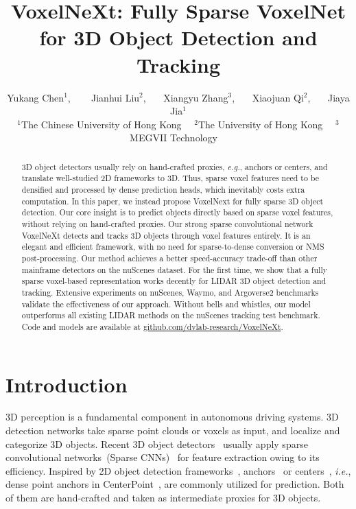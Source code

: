 \documentclass[10pt,twocolumn,letterpaper]{article}
\begin{document}
\title{VoxelNeXt: Fully Sparse VoxelNet for 3D Object Detection and Tracking}

\author{Yukang Chen$^{1}$,
~~~
Jianhui Liu$^{2}$,~~~
Xiangyu Zhang$^{3}$,~~~
Xiaojuan Qi$^{2}$,~~~
Jiaya Jia$^{1}$
\\[0.2cm]
$^1$The Chinese University of Hong Kong~~
$^2$The University of Hong Kong~~
$^3$MEGVII Technology~~
}
\maketitle

\begin{abstract}
   3D object detectors usually rely on hand-crafted proxies, {\em e.g.}, anchors or centers, and translate well-studied 2D frameworks to 3D. Thus, sparse voxel features need to be densified and processed by dense prediction heads, which inevitably costs extra computation.
   In this paper, we instead propose VoxelNext for fully sparse 3D object detection. Our core insight is to predict objects directly based on sparse voxel features, without relying on hand-crafted proxies.
   Our strong sparse convolutional network VoxelNeXt detects and tracks 3D objects through voxel features entirely. It is an elegant and efficient framework, with no need for sparse-to-dense conversion or NMS post-processing. Our method achieves a better speed-accuracy trade-off than other mainframe detectors on the nuScenes dataset.
   For the first time, we show that a fully sparse voxel-based representation works decently for LIDAR 3D object detection and tracking. Extensive experiments on nuScenes, Waymo, and Argoverse2 benchmarks validate the effectiveness of our approach. Without bells and whistles, our model outperforms all existing LIDAR methods on the nuScenes tracking test benchmark. Code and models are available at \href{https://github.com/dvlab-research/VoxelNeXt}{github.com/dvlab-research/VoxelNeXt}.
   
\end{abstract}

\section{Introduction}
\label{sec:intro}
3D perception is a fundamental component in autonomous driving systems. 3D detection networks take sparse point clouds or voxels as input, and localize and categorize 3D objects. Recent 3D object detectors~\cite{pvrcnn,centerpoint,voxel-rcnn} usually apply sparse convolutional networks~(Sparse CNNs)~\cite{second} for feature extraction owing to its efficiency. Inspired by 2D object detection frameworks~\cite{fasterrcnn,centernet}, anchors~\cite{second, voxel-rcnn} or centers~\cite{centerpoint}, {\em i.e.}, dense point anchors in CenterPoint~\cite{centerpoint}, are commonly utilized for prediction. 
Both of them are hand-crafted and taken as intermediate proxies for 3D objects. 
\end{document}
